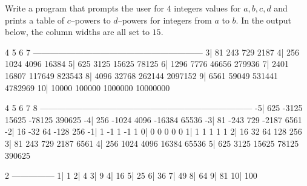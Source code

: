 Write a program that prompts the user for $4$ integers values for $a, b, c, d$
and prints a table of $c$--powers to $d$--powers for integers from $a$ to $b$.
In the output below, the column widths are all set to $15$.

\resett
\nextt
\begin{console}[fontsize=\footnotesize,commandchars=\\\{\}]
                    4              5              6              7
      ------------------------------------------------------------
    3|             81            243            729           2187
    4|            256           1024           4096          16384
    5|            625           3125          15625          78125
    6|           1296           7776          46656         279936
    7|           2401          16807         117649         823543
    8|           4096          32768         262144        2097152
    9|           6561          59049         531441        4782969
   10|          10000         100000        1000000       10000000
\end{console}

\nextt
\begin{console}[fontsize=\footnotesize,commandchars=\\\{\}]
                    4              5              6              7              8
      ---------------------------------------------------------------------------
   -5|            625          -3125          15625         -78125         390625
   -4|            256          -1024           4096         -16384          65536
   -3|             81           -243            729          -2187           6561
   -2|             16            -32             64           -128            256
   -1|              1             -1              1             -1              1
    0|              0              0              0              0              0
    1|              1              1              1              1              1
    2|             16             32             64            128            256
    3|             81            243            729           2187           6561
    4|            256           1024           4096          16384          65536
    5|            625           3125          15625          78125         390625
\end{console}

\nextt
\begin{console}[fontsize=\footnotesize,commandchars=\\\{\}]
                    2
      ---------------
    1|              1
    2|              4
    3|              9
    4|             16
    5|             25
    6|             36
    7|             49
    8|             64
    9|             81
   10|            100
\end{console}

